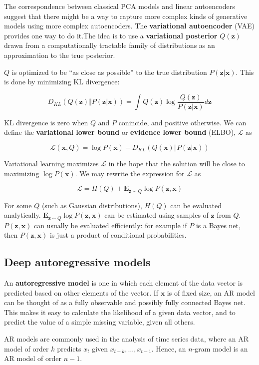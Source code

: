 \documentclass{article}
\renewcommand{\vec}[1]{\textbf{#1}}
\begin{document}
The correspondence between classical PCA models and linear autoencoders suggest that
there might be a way to capture more complex kinds of generative models using more
complex autoencoders. The \textbf{variational autoencoder} (VAE) provides one way
to do it.The idea is to use a \textbf{variational posterior} $Q(\vec{z})$ drawn from
a computationally tractable family of distributions as an approximation to
the true posterior.

$Q$ is optimized to be ``as close as possible'' to the true distribution $P(\vec{z} | \vec{x})$.
This is done by minimizing KL divergence:

\[
D_{KL}(Q(\vec{z}) \Vert P(\vec{z} | \vec{x})) = \int Q(\vec{z}) \log \frac{Q(\vec{z})}{P(\vec{z} | \vec{x})} d\vec{z}
\]

KL divergence is zero when $Q$ and $P$ conincide, and positive otherwise. We can define
the \textbf{variational lower bound} or \textbf{evidence lower bound} (ELBO), $\mathcal L$ as

\[
\mathcal L(\vec{x}, Q) = \log P(\vec{x}) - D_{KL}(Q(\vec{x}) \Vert P(\vec{z} | \vec{x}))
\]

Variational learning maximizes $\mathcal L$ in the hope that the solution will be
close to maximizing $\log P(\vec{x})$. We may rewrite the expression for $\mathcal L$
as 

\[
\mathcal L = H(Q) + \vec{E}_{\vec{z} \sim Q} \log P(\vec{z}, \vec{x})
\]

For some $Q$ (such as Gaussian distributions), $H(Q)$ can be evaluated analytically.
$\vec{E}_{\vec{z} \sim Q} \log P(\vec{z}, \vec{x})$ can be estimated using samples of
$\vec{z}$ from $Q$. $P(\vec{z}, \vec{x})$ can usually be evaluated efficiently: for example
if $P$ is a Bayes net, then $P(\vec{z}, \vec{x})$ is just a product of conditional
probabilities.

\subsection{Deep autoregressive models}

An \textbf{autoregressive model} is one in which each element of the data vector is
predicted based on other elements of the vector. If $\vec{x}$ is of fixed size,
an AR model can be thought of as a fully observable and possibly fully connected Bayes
net. This makes it easy to calculate the likelihood of a given data vector, and to
predict the value of a simple missing variable, given all others.

AR models are commonly used in the analysis of time series data, where an AR model
of order $k$ predicts $x_t$ given $x_{t-k}, \dots, x_{t-1}$. Hence, an $n$-gram
model is an AR model of order $n-1$.
\end{document}
